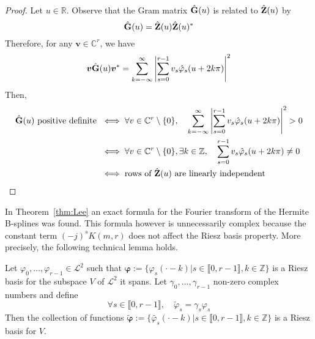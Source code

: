 \begin{proof}
  Let $u \in \mathbb{R}$. Observe that the Gram matrix $\hat{\mathbf{G}}(u)$ is related to $\hat{\mathbf{Z}}(u)$ by
  \begin{equation*}
    \hat{\mathbf{G}}(u) = \hat{\mathbf{Z}}(u) \hat{\mathbf{Z}}(u)^*
  \end{equation*}
  Therefore, for any $\bm{v} \in \mathbb{C}^r$, we have
  \begin{equation*}
    \bm{v}\hat{\mathbf{G}}(u)\bm{v}^* = \sum_{k=-\infty}^{\infty} \left| \sum_{s=0}^{r-1} v_s
    \hat{\varphi}_s(u+2k\pi)\right|^2
  \end{equation*}
  Then,
  \begin{align*}
    \hat{\mathbf{G}}(u) \ \text{positive definite} \ &\iff \forall v \in \mathbb{C}^r\setminus\{0\}, \quad 
    \sum_{k=-\infty}^{\infty} \left| \sum_{s=0}^{r-1} v_s \hat{\varphi}_s(u+2k\pi)\right|^2  > 0 \\
    & \iff \forall v \in \mathbb{C}^r\setminus\{0\}, \exists k \in \mathbb{Z}, \quad \sum_{s=0}^{r-1} v_s 
    \hat{\varphi}_s(u+2k\pi) \neq 0 \\
    & \iff \text{rows of $\hat{\mathbf{Z}}(u)$ are linearly independent}
  \end{align*}
\end{proof}

In Theorem~\ref{thm:Lee} an exact formula for the Fourier transform of the Hermite B-splines was found. This formula 
however is unnecessarily complex because the constant term ${(-j)}^s K(m,r)$ does not affect the Riesz basis property.  
More precisely, the following technical lemma holds.

\begin{lem}\label{lem:eqbasis}
  Let $\varphi_0, \ldots, \varphi_{r-1} \in \mathcal{L}^2$ such that $\bm{\varphi} := \{\varphi_s(\cdot-k) | s \in 
  \llbracket0, r-1\rrbracket, k \in \mathbb{Z}\}$ is a Riesz basis for the subspace $V$ of $\mathcal{L}^2$ it spans.  
  Let $\gamma_0, \ldots, \gamma_{r-1}$ non-zero complex numbers and define \begin{equation*}
    \forall s \in \llbracket0,r-1\rrbracket, \quad \tilde{\varphi}_s = \gamma_s \varphi_s
  \end{equation*}
  Then the collection of functions $\bm{\tilde{\varphi}} := \{\tilde{\varphi_s}(\cdot-k) | s \in \llbracket0, 
  r-1\rrbracket, k \in \mathbb{Z}\}$ is a Riesz basis for $V$.
\end{lem}

